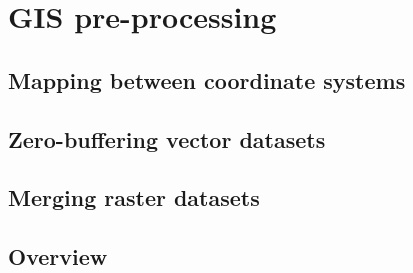 \appendix
\chapter{GIS pre-processing}

\section{Mapping between coordinate systems}%
\label{app:srid-change}


\section{Zero-buffering vector datasets}%
\label{app:zero-buffer}


\section{Merging raster datasets}%
\label{app:raster-merging}


\clearpage
\section{Overview}%
\label{app:preprocessing-overview}%

